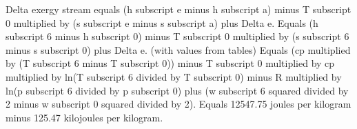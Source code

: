 Delta exergy stream equals (h subscript e minus h subscript a) minus T subscript 0 multiplied by (s subscript e minus s subscript a) plus Delta e.  
Equals (h subscript 6 minus h subscript 0) minus T subscript 0 multiplied by (s subscript 6 minus s subscript 0) plus Delta e.  
(with values from tables)  
Equals (cp multiplied by (T subscript 6 minus T subscript 0)) minus T subscript 0 multiplied by cp multiplied by ln(T subscript 6 divided by T subscript 0) minus R multiplied by ln(p subscript 6 divided by p subscript 0) plus (w subscript 6 squared divided by 2 minus w subscript 0 squared divided by 2).  
Equals 12547.75 joules per kilogram minus 125.47 kilojoules per kilogram.